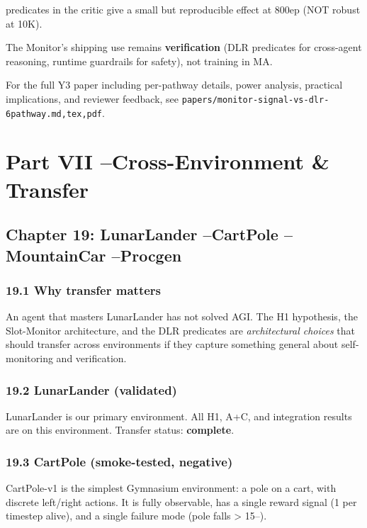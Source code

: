 \documentclass[11pt]{article}
\begin{document}
  predicates in the critic give a small but reproducible
  effect at 800ep (NOT robust at 10K).

The Monitor's shipping use remains \textbf{verification} (DLR
predicates for cross-agent reasoning, runtime guardrails for
safety), not training in MA.

For the full Y3 paper including per-pathway details, power
analysis, practical implications, and reviewer feedback, see
\texttt{papers/monitor-signal-vs-dlr-6pathway.{md,tex,pdf}}.

\hrulefill

\section{Part VII --Cross-Environment \& Transfer}

\subsection{Chapter 19: LunarLander --CartPole --MountainCar --Procgen}

\subsubsection{19.1 Why transfer matters}

An agent that masters LunarLander has not solved AGI. The H1 hypothesis, the
Slot-Monitor architecture, and the DLR predicates are \textit{architectural choices} that
should transfer across environments if they capture something general about
self-monitoring and verification.

\subsubsection{19.2 LunarLander (validated)}

LunarLander is our primary environment. All H1, A+C, and integration results are
on this environment. Transfer status: \textbf{complete}.

\subsubsection{19.3 CartPole (smoke-tested, negative)}

CartPole-v1 is the simplest Gymnasium environment: a pole on a cart, with
discrete left/right actions. It is fully observable, has a single reward signal
(1 per timestep alive), and a single failure mode (pole falls > 15--).
\end{document}
